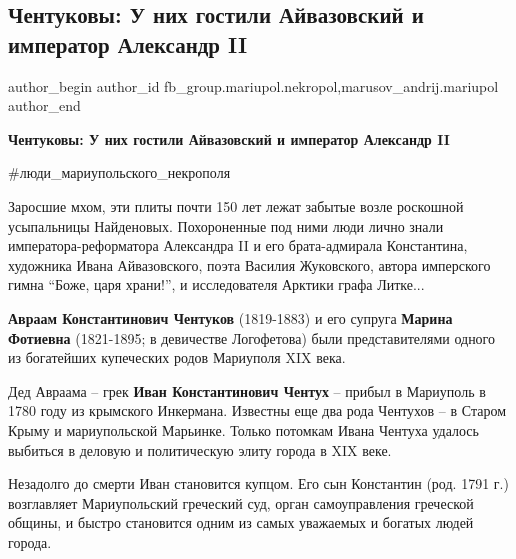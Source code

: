  
 
 
 
 

\subsection{Чентуковы: У них гостили Айвазовский и император Александр II}
\label{sec:15_06_2021.fb.fb_group.mariupol.nekropol.1.chentukovy}
 
\ifcmt
 author_begin
   author_id fb_group.mariupol.nekropol,marusov_andrij.mariupol
 author_end
\fi

\vspace{0.5cm}
\textbf{Чентуковы: У них гостили Айвазовский и император Александр II}

\#люди\_мариупольского\_некрополя

Заросшие мхом, эти плиты почти 150 лет лежат забытые возле роскошной
усыпальницы Найденовых. Похороненные под ними люди лично знали
императора-реформатора Александра II и его брата-адмирала Константина,
художника Ивана Айвазовского, поэта Василия Жуковского, автора имперского гимна
\enquote{Боже, царя храни!}, и исследователя Арктики графа Литке... 

\textbf{Авраам Константинович Чентуков} (1819-1883) и его супруга \textbf{Марина Фотиевна}
(1821-1895; в девичестве Логофетова) были представителями одного из богатейших
купеческих родов Мариуполя XIX века. 

Дед Авраама – грек \textbf{Иван Константинович Чентух} – прибыл в Мариуполь в 1780 году
из крымского Инкермана. Известны еще два рода Чентухов – в Старом Крыму и
мариупольской Марьинке. Только потомкам Ивана Чентуха удалось выбиться в
деловую и политическую элиту города в XIX веке.

Незадолго до смерти Иван становится купцом. Его сын Константин (род. 1791 г.)
возглавляет Мариупольский греческий суд, орган самоуправления греческой общины,
и быстро становится одним из самых уважаемых и богатых людей города.

